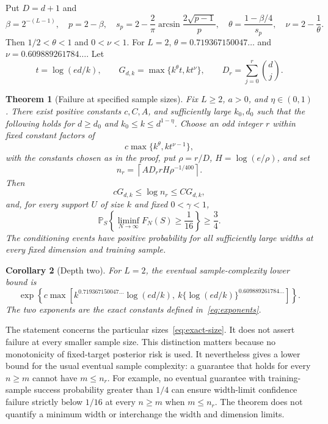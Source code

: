 \documentclass[11pt]{article}
\newtheorem{theorem}{Theorem}[section]
\newtheorem{corollary}[theorem]{Corollary}
\theoremstyle{remark}\newtheorem{remark}[theorem]{Remark}
\newcommand{\Pp}{\mathbb P}
\begin{document}
Put $D=d+1$ and
\begin{equation}\label{eq:exponents}
 \beta=2^{-(L-1)},\quad p=2-\beta,\quad
 s_p=2-\frac2\pi\arcsin\frac{2\sqrt{p-1}}p,\quad
 \theta=\frac{1-\beta/4}{s_p},\quad \nu=2-\frac1\theta.
\end{equation}
Then $1/2<\theta<1$ and $0<\nu<1$.
For $L=2$, $\theta=0.719367150047\ldots$ and
$\nu=0.609889261784\ldots$.
Let
\[
 t=\log(ed/k),\qquad
 G_{d,k}=\max\{k^\theta t,k t^\nu\},\qquad
 D_r=\sum_{j=0}^r\binom dj.
\]

\begin{theorem}[Failure at specified sample sizes]\label{thm:main}
Fix $L\ge2$, $a>0$, and $\eta\in(0,1)$. There exist positive
constants $c,C,A$, and sufficiently large $k_0,d_0$ such that the
following holds for $d\ge d_0$ and $k_0\le k\le d^{1-\eta}$.
Choose an odd integer $r$ within fixed constant factors of
\begin{equation}\label{eq:cutoff-choice}
 c\max\{k^\theta,k t^{\nu-1}\},
\end{equation}
with the constants chosen as in the proof, put
$\rho=r/D$, $H=\log(e/\rho)$, and set
\begin{equation}\label{eq:exact-size}
 n_r=\left\lceil A D_r rH\rho^{-1/400}\right\rceil.
\end{equation}
Then
\[
 cG_{d,k}\le\log n_r\le CG_{d,k},
\]
and, for every support $U$ of size $k$ and fixed $0<\gamma<1$,
\[
 \Pp_S\left\{\liminf_{N\to\infty}F_N(S)\ge\frac1{16}\right\}
 \ge\frac34.
\]
The conditioning events have positive probability for all sufficiently
large widths at every fixed dimension and training sample.
\end{theorem}


\begin{corollary}[Depth two]
For $L=2$, the eventual sample-complexity lower bound is
\[
 \exp\!\left\{c\max\left[
 k^{0.719367150047\ldots}\log(ed/k),\
 k\{\log(ed/k)\}^{0.609889261784\ldots}\right]\right\}.
\]
The two exponents are the exact constants defined in~\eqref{eq:exponents}.
\end{corollary}

The statement concerns the particular sizes~\eqref{eq:exact-size}.
It does not assert failure at every smaller sample size. This distinction
matters because no monotonicity of fixed-target posterior risk is used.
It nevertheless gives a lower bound for the usual eventual sample
complexity: a guarantee that holds for every $n\ge m$ cannot have
$m\le n_r$. For example, no eventual guarantee with training-sample
success probability greater than $1/4$ can ensure width-limit confidence
failure strictly below $1/16$ at every $n\ge m$ when $m\le n_r$.
The theorem does not quantify a minimum width or interchange the width
and dimension limits.
\end{document}

